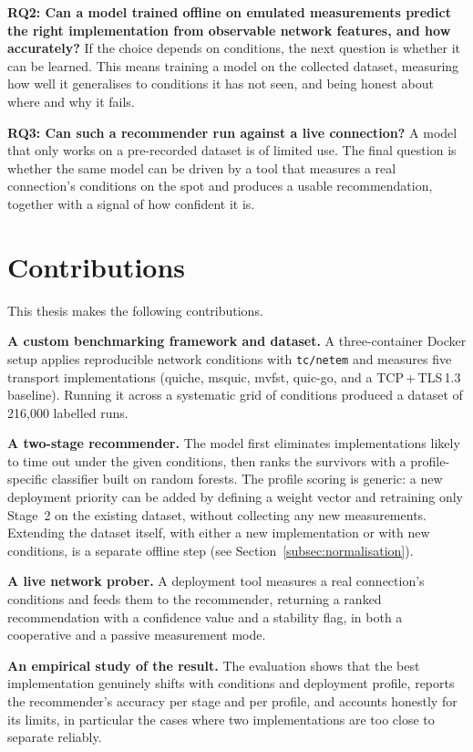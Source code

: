 \textbf{RQ2: Can a model trained offline on emulated measurements predict the
right implementation from observable network features, and how accurately?}
If the choice depends on conditions, the next question is whether it can be
learned. This means training a model on the collected dataset, measuring how
well it generalises to conditions it has not seen, and being honest about where
and why it fails.

\textbf{RQ3: Can such a recommender run against a live connection?} A model that
only works on a pre-recorded dataset is of limited use. The final question is
whether the same model can be driven by a tool that measures a real connection's
conditions on the spot and produces a usable recommendation, together with a
signal of how confident it is.

\section{Contributions}
\label{sec:intro-contributions}

This thesis makes the following contributions.

\textbf{A custom benchmarking framework and dataset.} A three-container Docker
setup applies reproducible network conditions with \texttt{tc/netem} and
measures five transport implementations (quiche, msquic, mvfst, quic-go, and a
TCP\,+\,TLS\,1.3 baseline). Running it across a systematic grid of conditions
produced a dataset of 216{,}000 labelled runs.

\textbf{A two-stage recommender.} The model first eliminates implementations
likely to time out under the given conditions, then ranks the survivors with a
profile-specific classifier built on random forests. The profile scoring is
generic: a new deployment priority can be added by defining a weight vector and
retraining only Stage~2 on the existing dataset, without collecting any new
measurements. Extending the dataset itself, with either a new implementation or with
new conditions, is a separate offline step (see Section~\ref{subsec:normalisation}).

\textbf{A live network prober.} A deployment tool measures a real connection's
conditions and feeds them to the recommender, returning a ranked recommendation
with a confidence value and a stability flag, in both a cooperative and a
passive measurement mode.

\textbf{An empirical study of the result.} The evaluation shows that the best
implementation genuinely shifts with conditions and deployment profile, reports
the recommender's accuracy per stage and per profile, and accounts honestly for
its limits, in particular the cases where two implementations are too close to
separate reliably.

